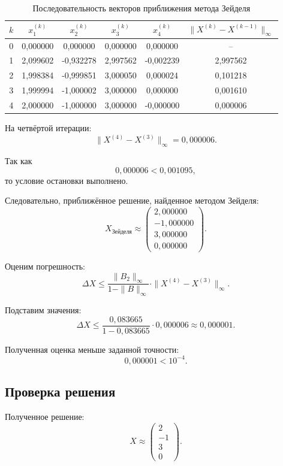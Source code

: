 \begin{table}[h!]
\centering
\caption{Последовательность векторов приближения метода Зейделя}
\begin{tabular}{|c|c|c|c|c|c|}
\hline
$k$ & $x_1^{(k)}$ & $x_2^{(k)}$ & $x_3^{(k)}$ & $x_4^{(k)}$ & $\|X^{(k)}-X^{(k-1)}\|_{\infty}$\\
\hline
0 & 0{,}000000 & 0{,}000000 & 0{,}000000 & 0{,}000000 & --\\
\hline
1 & 2{,}099602 & -0{,}932278 & 2{,}997562 & -0{,}002239 & 2{,}997562\\
\hline
2 & 1{,}998384 & -0{,}999851 & 3{,}000050 & 0{,}000024 & 0{,}101218\\
\hline
3 & 1{,}999994 & -1{,}000002 & 3{,}000000 & 0{,}000000 & 0{,}001610\\
\hline
4 & 2{,}000000 & -1{,}000000 & 3{,}000000 & -0{,}000000 & 0{,}000006\\
\hline
\end{tabular}
\end{table}

На четвёртой итерации:
\[
\|X^{(4)}-X^{(3)}\|_{\infty}=0{,}000006.
\]

Так как
\[
0{,}000006<0{,}001095,
\]
то условие остановки выполнено.

Следовательно, приближённое решение, найденное методом Зейделя:
\[
X_{\text{Зейделя}}
\approx
\begin{pmatrix}
2{,}000000\\
-1{,}000000\\
3{,}000000\\
0{,}000000
\end{pmatrix}.
\]

Оценим погрешность:
\[
\Delta X
\leq
\frac{\|B_2\|_{\infty}}{1-\|B\|_{\infty}}
\cdot
\|X^{(4)}-X^{(3)}\|_{\infty}.
\]

Подставим значения:
\[
\Delta X
\leq
\frac{0{,}083665}{1-0{,}083665}\cdot0{,}000006
\approx0{,}000001.
\]

Полученная оценка меньше заданной точности:
\[
0{,}000001<10^{-4}.
\]

\subsection{Проверка решения}

Полученное решение:
\[
X\approx
\begin{pmatrix}
2\\
-1\\
3\\
0
\end{pmatrix}.
\]


